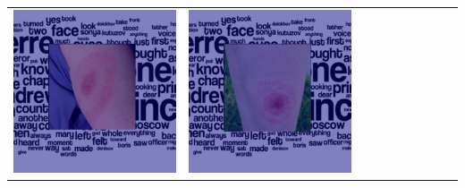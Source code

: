 \begin{landscape}
\begin{table}[]
\begin{tabular}{@{}c c c c c c c c c c@{}}
			\includegraphics[width=.12\textheight ,keepaspectratio]{images/pretraining/gradcam/3/VGG19CombinedGradCam.png} &
			\includegraphics[width=.12\textheight ,keepaspectratio]{images/pretraining/gradcam/9/VGG19CombinedGradCam.png} &

\end{tabular}
\end{table}
\end{landscape}
